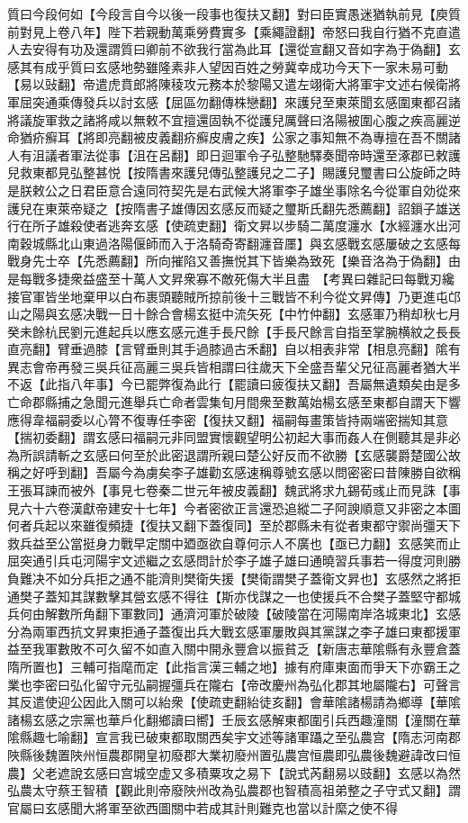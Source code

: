 質曰今段何如【今段言自今以後一段事也復扶又翻】對曰臣實愚迷猶執前見【庾質前對見上卷八年】陛下若親動萬乘勞費實多【乘繩證翻】帝怒曰我自行猶不克直遣人去安得有功及還謂質曰卿前不欲我行當為此耳【還從宣翻又音如字為于偽翻】玄感其有成乎質曰玄感地勢雖隆素非人望因百姓之勞冀幸成功今天下一家未易可動【易以䜴翻】帝遣虎賁郎將陳稜攻元務本於黎陽又遣左翊衛大將軍宇文述右候衛將軍屈突通乘傳發兵以討玄感【屈區勿翻傳株戀翻】來護兒至東萊聞玄感圍東都召諸將議旋軍救之諸將咸以無敕不宜擅還固執不從護兒厲聲曰洛陽被圍心腹之疾高麗逆命猶疥癬耳【將即亮翻被皮義翻疥癬皮膚之疾】公家之事知無不為專擅在吾不關諸人有沮議者軍法從事【沮在呂翻】即日迴軍令子弘整馳驛奏聞帝時還至涿郡已敕護兒救東都見弘整甚悦【按隋書來護兒傳弘整護兒之二子】賜護兒璽書曰公旋師之時是朕敕公之日君臣意合遠同符契先是右武候大將軍李子雄坐事除名今從軍自効從來護兒在東萊帝疑之【按隋書子雄傳因玄感反而疑之璽斯氏翻先悉薦翻】詔鎻子雄送行在所子雄殺使者逃奔玄感【使疏吏翻】衛文昇以步騎二萬度瀍水【水經瀍水出河南穀城縣北山東過洛陽偃師而入于洛騎奇寄翻瀍音㕓】與玄感戰玄感屢破之玄感每戰身先士卒【先悉薦翻】所向摧陷又善撫悦其下皆樂為致死【樂音洛為于偽翻】由是每戰多捷衆益盛至十萬人文昇衆寡不敵死傷大半且盡　【考異曰雜記曰每戰刃纔接官軍皆坐地棄甲以白布裹頭聽賊所掠前後十三戰皆不利今從文昇傳】乃更進屯邙山之陽與玄感决戰一日十餘合會楊玄挺中流矢死【中竹仲翻】玄感軍乃稍却秋七月癸未餘杭民劉元進起兵以應玄感元進手長尺餘【手長尺餘言自指至掌腕横紋之長長直亮翻】臂垂過膝【言臂垂則其手過膝過古禾翻】自以相表非常【相息亮翻】隂有異志會帝再發三吳兵征高麗三吳兵皆相謂曰往歲天下全盛吾輩父兄征高麗者猶大半不返【此指八年事】今已罷弊復為此行【罷讀曰疲復扶又翻】吾屬無遺類矣由是多亡命郡縣捕之急聞元進舉兵亡命者雲集旬月間衆至數萬始楊玄感至東都自謂天下響應得韋福嗣委以心膂不復專任李密【復扶又翻】福嗣每畫策皆持兩端密揣知其意【揣初委翻】謂玄感曰福嗣元非同盟實懷觀望明公初起大事而姦人在側聽其是非必為所誤請斬之玄感曰何至於此密退謂所親曰楚公好反而不欲勝【玄感襲爵楚國公故稱之好呼到翻】吾屬今為虜矣李子雄勸玄感速稱尊號玄感以問密密曰昔陳勝自欲稱王張耳諫而被外【事見七卷秦二世元年被皮義翻】魏武將求九錫荀彧止而見誅【事見六十六卷漢獻帝建安十七年】今者密欲正言還恐追縱二子阿諛順意又非密之本圖何者兵起以來雖復頻捷【復扶又翻下蓋復同】至於郡縣未有從者東都守禦尚彊天下救兵益至公當挺身力戰早定關中廼亟欲自尊何示人不廣也【亟已力翻】玄感笑而止屈突通引兵屯河陽宇文述繼之玄感問計於李子雄子雄曰通曉習兵事若一得度河則勝負難决不如分兵拒之通不能濟則樊衛失援【樊衛謂樊子蓋衛文昇也】玄感然之將拒通樊子蓋知其謀數擊其營玄感不得往【斯亦伐謀之一也使援兵不合樊子蓋堅守都城兵何由解數所角翻下軍數同】通濟河軍於破陵【破陵當在河陽南岸洛城東北】玄感分為兩軍西抗文昇東拒通子蓋復出兵大戰玄感軍屢敗與其黨謀之李子雄曰東都援軍益至我軍數敗不可久留不如直入關中開永豐倉以振貧乏【新唐志華隂縣有永豐倉蓋隋所置也】三輔可指麾而定【此指言漢三輔之地】據有府庫東面而爭天下亦霸王之業也李密曰弘化留守元弘嗣握彊兵在隴右【帝改慶州為弘化郡其地屬隴右】可聲言其反遣使迎公因此入關可以紿衆【使疏吏翻紿徒亥翻】會華隂諸楊請為鄉導【華隂諸楊玄感之宗黨也華戶化翻鄉讀曰嚮】壬辰玄感解東都圍引兵西趣潼關【潼關在華隂縣趣七喻翻】宣言我已破東都取關西矣宇文述等諸軍躡之至弘農宫【隋志河南郡陜縣後魏置陜州恒農郡開皇初廢郡大業初廢州置弘農宫恒農即弘農後魏避諱改曰恒農】父老遮說玄感曰宫城空虚又多積粟攻之易下【說式芮翻易以豉翻】玄感以為然弘農太守蔡王智積【觀此則帝廢陜州改為弘農郡也智積高祖弟整之子守式又翻】謂官屬曰玄感聞大將軍至欲西圖關中若成其計則難克也當以計縻之使不得